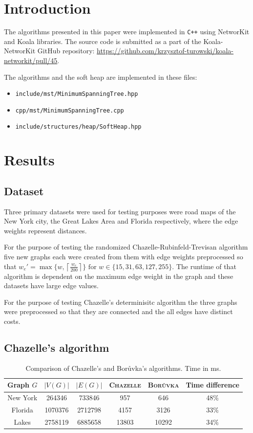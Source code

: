 \section{Introduction}
The algorithms presented in this paper were implemented in \texttt{C++} using NetworKit and Koala libraries. The source code is submitted as a part of the Koala-NetworKit GitHub repository: \url{https://github.com/krzysztof-turowski/koala-networkit/pull/45}.

The algorithms and the soft heap are implemented in these files:
\begin{itemize}
    \item \texttt{include/mst/MinimumSpanningTree.hpp}
    \item \texttt{cpp/mst/MinimumSpanningTree.cpp}
    \item \texttt{include/structures/heap/SoftHeap.hpp}
\end{itemize}


\section{Results}
\subsection{Dataset}
Three primary datasets were used for testing purposes were road maps of the New York city, the Great Lakes Area and Florida respectively, where the edge weights represent distances. 

For the purpose of testing the randomized Chazelle-Rubinfeld-Trevisan algorithm five new graphs each were created from them with edge weights preprocessed so that $w_e' = \max\{w, \left\lceil \frac{w_e}{200}\right\rceil\} \text{ for } w \in \{15, 31, 63, 127, 255\}$. The runtime of that algorithm is dependent on the maximum edge weight in the graph and these datasets have large edge values.

For the purpose of testing Chazelle's determinisitc algorithm the three graphs were preprocessed so that they are connected and the all edges have distinct costs.

\subsection{Chazelle's algorithm}
\begin{table}[ht!]
  \centering
  \begin{tabular}{|c|c|c|c|c|c|}
    \hline
    Graph $G$ & $|V(G)|$ & $|E(G)|$ & \textsc{Chazelle} & \textsc{Bor\r{u}vka} & Time difference \\ \hline
    New York & 264346 & 733846  & 957 & 646 & 48\% \\ \hline
    Florida & 1070376 & 2712798  & 4157 & 3126 & 33\%  \\ \hline
    Lakes & 2758119 & 6885658 & 13803 & 10292 & 34\% \\ \hline
    \end{tabular}
  \caption{Comparison of Chazelle's and Bor\r{u}vka's algorithms. Time in ms.}
  \label{t1}
\end{table}
\FloatBarrier

